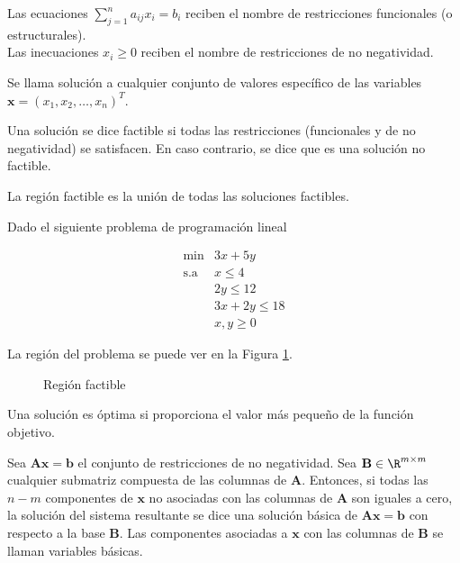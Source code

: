 \begin{defi}
Las ecuaciones $\sum_{j=1}^{n} a_{ij}x_i = b_i$ reciben el nombre de restricciones funcionales (o estructurales).\\

Las inecuaciones $x_i \geq 0$ reciben el nombre de restricciones de no negatividad.
\end{defi}

\begin{defi}
Se llama solución a cualquier conjunto de valores específico de las variables $\mathbf{x} = (x_1, x_2, \dots, x_n)^T$.
\end{defi}

\begin{defi}
Una solución se dice factible si todas las restricciones (funcionales y de no negatividad) se satisfacen. En caso contrario, se dice que es una solución no factible.
\end{defi}

\begin{defi}
La región factible es la unión de todas las soluciones factibles.
\end{defi}

\begin{ejemplo}
Dado el siguiente problema de programación lineal

\begin{equation}
\begin{array}{rl}
\mathrm{min} & 3x + 5y\\
\mathrm{s.a} & x \leq 4\\
			 & 2y \leq 12\\
			 & 3x + 2y \leq 18\\
			 & x, y \geq 0 
\end{array} 
\end{equation}

La región del problema se puede ver en la Figura \ref{fig:ejemplo_region_factible}.

\begin{figure}[htb]
\centering
\ejemploregionfactible
\caption{Región factible}
\label{fig:ejemplo_region_factible}
\end{figure}
\end{ejemplo}

\begin{defi}
Una solución es óptima si proporciona el valor más pequeño de la función objetivo.
\end{defi}

\begin{defi}
Sea $\mathbf{A x} = \mathbf{b}$ el conjunto de restricciones de no negatividad. Sea $\mathbf{B} \in \R^{m \times m}$ cualquier submatriz compuesta de las columnas de $\mathbf{A}$. Entonces, si todas las $n-m$ componentes de $\mathbf{x}$ no asociadas con las columnas de $\mathbf{A}$ son iguales a cero, la solución del sistema resultante se dice una solución básica de $\mathbf{A x} = \mathbf{b}$ con respecto a la base $\mathbf{B}$. Las componentes asociadas a $\mathbf{x}$ con las columnas de $\mathbf{B}$ se llaman variables básicas.
\end{defi}

